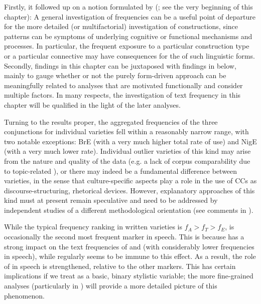 Firstly, it followed up on a notion formulated by \citeauthor{Hilpert2013b} (\citeyear[462]{Hilpert2013b}; see the very beginning of this chapter): A general investigation of frequencies can be a useful point of departure for the more detailed (or multifactorial) investigation of constructions, since  patterns can be symptoms of underlying cognitive or functional mechanisms and processes. In particular, the frequent exposure to a particular construction type or a particular connective may have consequences for the  of such linguistic forms. Secondly, findings in this chapter can be juxtaposed with findings in  below, mainly to gauge whether or not the purely form-driven approach can be meaningfully related to analyses that are motivated functionally and consider multiple factors. In many respects, the investigation of text frequency in this chapter will be qualified in the light of the later analyses.

Turning to the results proper, the aggregated frequencies of the three conjunctions for individual varieties fell within a reasonably narrow range, with two notable exceptions: BrE (with a very much higher total rate of use) and NigE (with a very much lower rate). Individual outlier varieties of this kind may arise from the nature and quality of the data (e.g. a lack of corpus comparability due to topic-related ), or there may indeed be a fundamental difference between varieties, in the sense that culture-specific aspects play a role in the use of CCs as discourse-structuring, rhetorical devices. However, explanatory approaches of this kind must at present remain speculative and need to be addressed by independent studies of a different methodological orientation (see comments in ).

While the typical frequency ranking in written varieties is $f_A > f_T > f_E$,  is occasionally the second most frequent marker in speech. This is because  has a strong impact on the text frequencies of  and  (with considerably lower frequencies in speech), while  regularly seems to be immune to this effect. As a result, the role of  in speech is strengthened, relative to the other markers. This has certain implications if we treat  as a basic, binary stylistic variable; the more fine-grained analyses (particularly in ) will provide a more detailed picture of this phenomenon.


